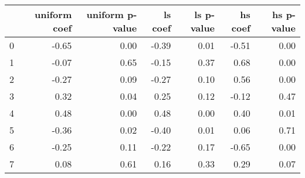 \begin{tabular}{lrrrrrr}
\toprule
 & uniform coef & uniform p-value & ls coef & ls p-value & hs coef & hs p-value \\
\midrule
0 & -0.65 & 0.00 & -0.39 & 0.01 & -0.51 & 0.00 \\
1 & -0.07 & 0.65 & -0.15 & 0.37 & 0.68 & 0.00 \\
2 & -0.27 & 0.09 & -0.27 & 0.10 & 0.56 & 0.00 \\
3 & 0.32 & 0.04 & 0.25 & 0.12 & -0.12 & 0.47 \\
4 & 0.48 & 0.00 & 0.48 & 0.00 & 0.40 & 0.01 \\
5 & -0.36 & 0.02 & -0.40 & 0.01 & 0.06 & 0.71 \\
6 & -0.25 & 0.11 & -0.22 & 0.17 & -0.65 & 0.00 \\
7 & 0.08 & 0.61 & 0.16 & 0.33 & 0.29 & 0.07 \\
\bottomrule
\end{tabular}
